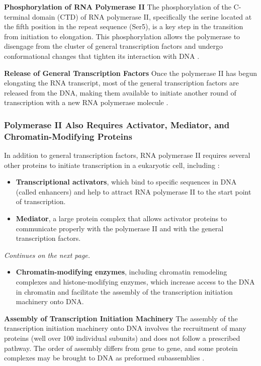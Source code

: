 \textbf{Phosphorylation of RNA Polymerase II}
The phosphorylation of the C-terminal domain (CTD) of RNA polymerase II, specifically the serine located at the fifth position in the repeat sequence (Ser5), is a key step in the transition from initiation to elongation. This phosphorylation allows the polymerase to disengage from the cluster of general transcription factors and undergo conformational changes that tighten its interaction with DNA \cite*{L1-Chapter6}.

\textbf{Release of General Transcription Factors} 
Once the polymerase II has begun elongating the RNA transcript, most of the general transcription factors are released from the DNA, making them available to initiate another round of transcription with a new RNA polymerase molecule \cite*{L1-Chapter6}.

\subsubsection*{Polymerase II Also Requires Activator, Mediator, and Chromatin-Modifying Proteins}
In addition to general transcription factors, RNA polymerase II requires several other proteins to initiate transcription in a eukaryotic cell, including \cite*{L1-Chapter6}:
\begin{highlight}
    \begin{itemize}
        \item \textbf{Transcriptional activators}, which bind to specific sequences in DNA (called enhancers) and help to attract RNA polymerase II to the start point of transcription.
        \item \textbf{Mediator}, a large protein complex that allows activator proteins to communicate properly with the polymerase II and with the general transcription factors.
    \end{itemize}
\end{highlight}
\textit{Continues on the next page.}
\begin{highlight}
    \begin{itemize}
        \item \textbf{Chromatin-modifying enzymes}, including chromatin remodeling complexes and histone-modifying enzymes, which increase access to the DNA in chromatin and facilitate the assembly of the transcription initiation machinery onto DNA.
    \end{itemize}
\end{highlight}

\textbf{Assembly of Transcription Initiation Machinery}
The assembly of the transcription initiation machinery onto DNA involves the recruitment of many proteins (well over 100 individual subunits) and does not follow a prescribed pathway. The order of assembly differs from gene to gene, and some protein complexes may be brought to DNA as preformed subassemblies \cite*{L1-Chapter6}.

